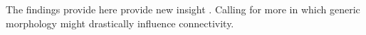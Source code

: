 The findings provide here provide new insight . Calling for more in which
generic morphology might drastically influence connectivity.

  







 

















